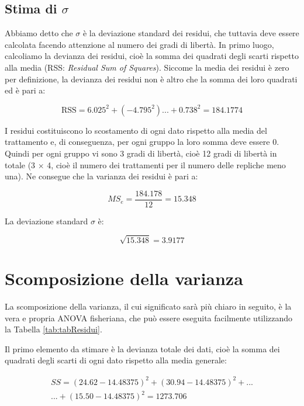 \documentclass[a4paper,12pt,oneside]{book}
\begin{document}
\hypertarget{stima-di-sigma}{%
\subsection{\texorpdfstring{Stima di \(\sigma\)}{Stima di \textbackslash sigma}}\label{stima-di-sigma}}

Abbiamo detto che \(\sigma\) è la deviazione standard dei residui, che tuttavia deve essere calcolata facendo attenzione al numero dei gradi di libertà. In primo luogo, calcoliamo la devianza dei residui, cioè la somma dei quadrati degli scarti rispetto alla media (RSS: \emph{Residual Sum of Squares}). Siccome la media dei residui è zero per definizione, la devianza dei residui non è altro che la somma dei loro quadrati ed è pari a:

\[\textrm{RSS} = 6.025^2 + (-4.795^2) ... + 0.738^2 = 184.1774\]

I residui costituiscono lo scostamento di ogni dato rispetto alla media del trattamento e, di conseguenza, per ogni gruppo la loro somma deve essere 0. Quindi per ogni gruppo vi sono 3 gradi di libertà, cioè 12 gradi di libertà in totale (3 \(\times\) 4, cioè il numero dei trattamenti per il numero delle repliche meno una). Ne consegue che la varianza dei residui è pari a:

\[MS_{e}  = \frac{184.178}{12} = 15.348\]

La deviazione standard \(\sigma\) è:

\[ \sqrt{15.348} = 3.9177\]

\hypertarget{scomposizione-della-varianza}{%
\section{Scomposizione della varianza}\label{scomposizione-della-varianza}}

La scomposizione della varianza, il cui significato sarà più chiaro in seguito, è la vera e propria ANOVA fisheriana, che può essere eseguita facilmente utilizzando la Tabella \ref{tab:tabResidui}.

Il primo elemento da stimare è la devianza totale dei dati, cioè la somma dei quadrati degli scarti di ogni dato rispetto alla media generale:

\[\begin{array}{c}
SS = \left(24.62 - 14.48375\right)^2 + \left(30.94 - 14.48375\right)^2 + ... \\
... + \left(15.50 - 14.48375\right)^2 = 1273.706
\end{array}\]
\end{document}
